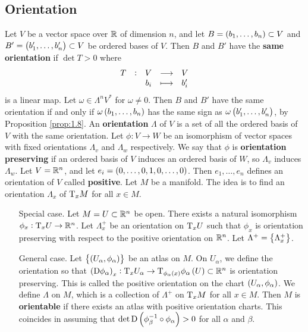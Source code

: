 \pagebreak

\subsection{Orientation}

Let $ V $ be a vector space over $ \mathbb{R} $ of dimension $ n $, and let $ B = \br{b_1, \dots, b_n} \subset V $ and $ B' = \br{b_1', \dots, b_n'} \subset V $ be ordered bases of $ V $. Then $ B $ and $ B' $ have the \textbf{same orientation} if $ \det T > 0 $ where
$$ \function[T]{V}{V}{b_i}{b_i'} $$
is a linear map. Let $ \omega \in \Lambda^nV^* $ for $ \omega \ne 0 $. Then $ B $ and $ B' $ have the same orientation if and only if $ \omega\br{b_1, \dots, b_n} $ has the same sign as $ \omega\br{b_1', \dots, b_n'} $, by Proposition \ref{prop:1.8}. An \textbf{orientation} $ \Lambda $ of $ V $ is a set of all the ordered basis of $ V $ with the same orientation. Let $ \phi : V \to W $ be an isomorphism of vector spaces with fixed orientations $ \Lambda_v $ and $ \Lambda_w $ respectively. We say that $ \phi $ is \textbf{orientation preserving} if an ordered basis of $ V $ induces an ordered basis of $ W $, so $ \Lambda_v $ induces $ \Lambda_w $. Let $ V = \mathbb{R}^n $, and let $ e_i = \br{0, \dots, 0, 1, 0, \dots, 0} $. Then $ e_1, \dots, e_n $ defines an orientation of $ V $ called \textbf{positive}. Let $ M $ be a manifold. The idea is to find an orientation $ \Lambda_x $ of $ \mathrm{T}_xM $ for all $ x \in M $.
\begin{itemize}[leftmargin=1in]
\item[Special case.] Let $ M = U \subset \mathbb{R}^n $ be open. There exists a natural isomorphism $ \phi_x : \mathrm{T}_xU \to \mathbb{R}^n $. Let $ \Lambda_x^+ $ be an orientation on $ \mathrm{T}_xU $ such that $ \phi_x $ is orientation preserving with respect to the positive orientation on $ \mathbb{R}^n $. Let $ \Lambda^+ = \cbr{\Lambda_x^+} $.
\item[General case.] Let $ \cbr{\br{U_\alpha, \phi_\alpha}} $ be an atlas on $ M $. On $ U_\alpha $, we define the orientation so that $ \br{\D\phi_\alpha}_x : \T_xU_\alpha \to \T_{\phi_\alpha\br{x}}\phi_\alpha\br{U} \subset \RR^n $ is orientation preserving. This is called the positive orientation on the chart $ \br{U_\alpha, \phi_\alpha} $. We define $ \Lambda $ on $ M $, which is a collection of $ \Lambda^+ $ on $ \mathrm{T}_xM $ for all $ x \in M $. Then $ M $ is \textbf{orientable} if there exists an atlas with positive orientation charts. This coincides in assuming that $ \det \D\br{\phi_\beta^{-1} \circ \phi_\alpha} > 0 $ for all $ \alpha $ and $ \beta $.
\end{itemize}

